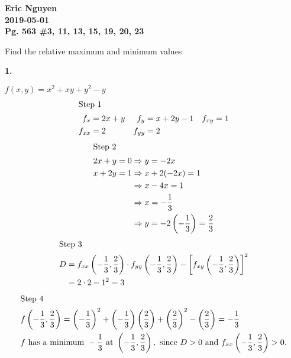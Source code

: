 \documentclass[12pt]{article}
\newenvironment{problem}[2][]{
    \begin{trivlist}
        \item[
            {\bfseries #1}
            {\bfseries #2.}
        ]
}{\end{trivlist}}
\newcommand{\assignment}{Pg. 563 \#3, 11, 13, 15, 19, 20, 23}
\newcommand{\name}{Eric Nguyen}
\newcommand{\duedate}{2019-05-01}
\newcommand{\details}{\noindent\textbf{\name \\\duedate \\\assignment}}
\begin{document}
\details

\bigskip

\noindent Find the relative maximum and minimum values

\begin{problem}{1}
    $f(x, y) = x^2 + xy + y^2 - y$
    \begin{align*}
        \shortintertext{Step 1}
        f_x &= 2x + y & f_y &= x + 2y - 1 & f_{xy} &= 1 \\
        f_{xx} &= 2 & f_{yy} &= 2 
    \end{align*}
    \begin{align}
        \shortintertext{Step 2}
        2x + y &= 0 \Rightarrow y = -2x \\
        x + 2y &= 1 \Rightarrow x + 2(-2x) = 1 \\
        &\phantom{=. 0} \Rightarrow x - 4x = 1 \\
        &\phantom{=. 0} \Rightarrow x = -\frac{1}{3} \\
        &\phantom{=. 0} \Rightarrow y = -2 \left(-\frac{1}{3}\right) = \frac{2}{3}
    \end{align}
    \begin{align}
        \shortintertext{Step 3}
        D &= f_{xx} \left(-\frac{1}{3}, \frac{2}{3}\right) \cdot f_{yy} \left(-\frac{1}{3}, \frac{2}{3}\right) - \left[f_{xy} \left(-\frac{1}{3}, \frac{2}{3}\right)\right]^2 \\
        &= 2 \cdot 2 - 1^2 = 3
    \end{align}
    \begin{align}
        \shortintertext{Step 4}
        &f \left(-\frac{1}{3}, \frac{2}{3}\right) = \left(-\frac{1}{3}\right)^2 + \left(-\frac{1}{3}\right) \left(\frac{2}{3}\right) + \left(\frac{2}{3}\right)^2 - \left(\frac{2}{3}\right) = -\frac{1}{3} \\
        &f \text{ has a minimum } -\frac{1}{3} \text{ at } \left(-\frac{1}{3}, \frac{2}{3}\right), \text{ since } D > 0 \text{ and } f_{xx} \left(-\frac{1}{3}, \frac{2}{3}\right) > 0. \\
    \end{align}
\end{problem}
\end{document}
